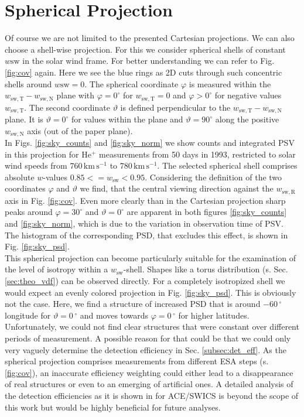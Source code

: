 \section{Spherical Projection}
Of course we are not limited to the presented Cartesian projections.
We can also choose a shell-wise projection. For this we consider spherical shells of constant $w\mathrm{sw}$ in the solar wind frame. For better understanding we can refer to Fig. \ref{fig:cov} again. Here we see the blue rings as 2D cuts through such concentric shells around $w\mathrm{sw} = 0$. The spherical coordinate $\varphi$ is measured within the $w_\mathrm{sw,T}-w_\mathrm{sw,N}$ plane with $\varphi = 0^\circ$ for $w_\mathrm{sw,T} = 0$ and $\varphi > 0^\circ$ for negative values $w_\mathrm{sw,T}$. The second coordinate $\vartheta$ is defined perpendicular to the $w_\mathrm{sw,T}-w_\mathrm{sw,N}$ plane. It is $\vartheta = 0 ^\circ$ for values within the plane and $\vartheta = 90^\circ$ along the positive $w_\mathrm{sw,N}$ axis (out of the paper plane).
\\
In Figs. \ref{fig:sky_counts} and \ref{fig:sky_norm} we show counts and integrated PSV in this projection for $\mathrm{He^{+}}$ measurements from 50 days in 1993, restricted to solar wind speeds from $760 \, \mathrm{km\,s^{-1}}$ to $780 \, \mathrm{km\,s^{-1}}$. The selected spherical shell comprises absolute $w$-values $0.85 <= w_\mathrm{sw} < 0.95$. Considering the definition of the two coordinates $\varphi$ and $\vartheta$ we find, that the central viewing direction against the $w_\mathrm{sw,R}$ axis in Fig. \ref{fig:cov}. Even more clearly than in the Cartesian projection sharp peaks around $\varphi = 30 ^\circ$ and $\vartheta = 0 ^\circ$ are apparent in both figures \ref{fig:sky_counts} and \ref{fig:sky_norm}, which is due to the variation in observation time of PSV. The histogram of the corresponding PSD, that excludes this effect, is shown in Fig. \ref{fig:sky_psd}.\\
This spherical projection can become particularly suitable for the examination of the level of isotropy within a $w_\mathrm{sw}$-shell. Shapes like a torus distribution (s. Sec. \ref{sec:theo_vdf}) can be observed directly. For a completely isotropized shell we would expect an evenly colored projection in Fig. \ref{fig:sky_psd}. This is obviously not the case. Here, we find a structure of increased PSD that is around $-60\,^\circ$ longitude for $\vartheta = 0\,^\circ$ and moves towards $\varphi = 0\,^\circ$ for higher latitudes.
\\
Unfortunately, we could not find clear structures that were constant over different periods of measurement. A possible reason for that could be that we could only very vaguely determine the detection efficiency in Sec. \ref{subsec:det_eff}. As the spherical projection comprises measurements from different ESA steps (s. \ref{fig:cov}), an inaccurate efficiency weighting could either lead to a disappearance of real structures or even to an emerging of artificial ones. A detailed analysis of the detection efficiencies as it is shown in \citet{koeten} for ACE/SWICS is beyond the scope of this work but would be highly beneficial for future analyses.
